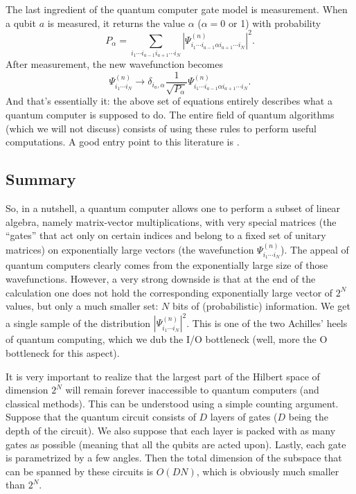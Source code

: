 \documentclass{SciPost}
\begin{document}
The last ingredient of the quantum computer gate model is measurement. When a qubit $a$ is
measured, it returns the value $\alpha$ ($\alpha = 0$ or 1) with probability
\begin{equation}
P_\alpha = \sum_{i_1\cdots{}i_{a-1} i_{a+1}\cdots{}i_N} \left|
\Psi_{i_1\cdots{}i_{a-1} \alpha i_{a+1}\cdots{}i_N}^{(n)} \right|^2.
\end{equation}
After measurement, the new wavefunction becomes
\begin{equation}
\Psi_{i_1\cdots{}i_N}^{(n)}\rightarrow
\delta_{i_a,\alpha} \frac{1}{\sqrt{P_\alpha}}
\Psi_{i_1\cdots{}i_{a-1} \alpha i_{a+1}\cdots{}i_N}^{(n)}.
\end{equation}
And that's essentially it: the above set of equations entirely describes what a quantum computer is supposed to do. The entire field of quantum algorithms (which we will not discuss) consists of using these rules to perform useful computations.
A good entry point to this literature is \cite{nielsen2000}.

\subsection{Summary}
So, in a nutshell, a quantum computer allows one to perform a
subset of linear algebra, namely matrix-vector multiplications, with very special
matrices (the ``gates'' that act only on certain indices and belong to a fixed set of unitary matrices) on exponentially large vectors (the wavefunction $\Psi_{i_1\cdots{}i_N}^{(n)}$). The appeal of quantum computers clearly comes from the exponentially large size of those wavefunctions. However, a very strong downside is that at the end of the calculation one does not hold the corresponding exponentially large vector of $2^N$ values, but only a much smaller set: $N$ bits of (probabilistic) information. We get a single sample of the distribution $|\Psi_{i_1\cdots{}i_N}^{(n)}|^2$. This is one of the two Achilles' heels of quantum computing, which we dub the I/O bottleneck (well, more the O bottleneck for this aspect).

It is very important to realize that the largest part of the Hilbert space of dimension
$2^N$ will remain forever inaccessible to quantum computers (and classical methods). This can be understood using a simple counting argument. Suppose that the quantum circuit consists of $D$ layers of gates ($D$ being the depth of the circuit). We also suppose that each layer is packed with as many gates as possible (meaning that all the qubits are acted upon). Lastly, each gate is parametrized by a few angles. Then the total
dimension of the subspace that can be spanned by these circuits is $O(D N)$, which is obviously much smaller than $2^N$.
\end{document}
